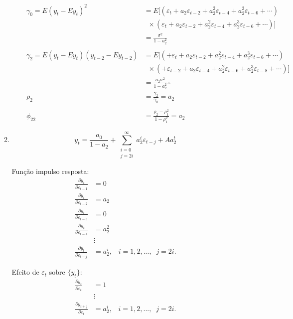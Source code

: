 \begin{enumerate}
\begin{enumerate}
\begin{enumerate}
	\begin{align*}
		\gamma_0=E(y_t-Ey_t)^2&=E[(\varepsilon_t+a_2\varepsilon_{t-2}+a_2^2\varepsilon_{t-4}+a_2^3\varepsilon_{t-6}+\cdots)\\
		&\;\;\times(\varepsilon_t+a_2\varepsilon_{t-2}+a_2^2\varepsilon_{t-4}+a_2^3\varepsilon_{t-6}+\cdots)]\\
		&=\frac{\sigma^2}{1-a_2^2}\\
		\\
		\gamma_2=E(y_t-Ey_t)(y_{t-2}-Ey_{t-2})&=E[(+\varepsilon_t+a_2\varepsilon_{t-2}+a_2^2\varepsilon_{t-4}+a_2^3\varepsilon_{t-6}+\cdots)\\
		&\;\;\times(+\varepsilon_{t-2}+a_2\varepsilon_{t-4}+a_2^2\varepsilon_{t-6}+a_2^3\varepsilon_{t-8}+\cdots)]\\
		&=\frac{a_2\sigma^2}{1-a_2^2}\therefore\\
		\rho_2&=\frac{\gamma_2}{\gamma_0}=a_2\\
		\\
		\phi_{22}&=\frac{\rho_2-\rho_1^2}{1-\rho_1^2}=a_2
	\end{align*}

		\end{enumerate}
	
	\item %
	
	$$y_t=\frac{a_0}{1-a_2}+\sum \limits_{\substack{i=0\\	j=2i}}^{\infty}a_2^i\varepsilon_{t-j}+Aa_2^t$$
		
		Função impulso resposta: 			
		\begin{align*}
			\frac{\partial y_t}{\partial\varepsilon_{t-1}}&=0\\
			\frac{\partial y_t}{\partial\varepsilon_{t-2}}&=a_2\\
			\frac{\partial y_t}{\partial\varepsilon_{t-3}}&=0\\
			\frac{\partial y_t}{\partial\varepsilon_{t-4}}&=a_2^2\\
			&\vdots\\
			\frac{\partial y_t}{\partial\varepsilon_{t-j}}&=a_2^{i},\;\;\; i=1,2,...,\;\;j=2i.
		\end{align*}
	
Efeito de $\varepsilon_t$ sobre $\{y_t\}$:
\begin{align*}
\frac{\partial y_t}{\partial\varepsilon_{t}}&=1\\
&\vdots\\
\frac{\partial y_{t+j}}{\partial\varepsilon_{t}}&=a_2^{i},\;\;\; i=1,2,...,\;\;j=2i.
\end{align*}
	
	
	\end{enumerate}
		
		
	
	\end{enumerate}